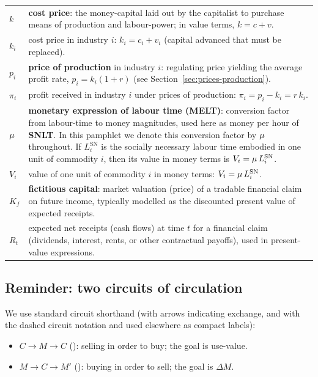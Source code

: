 \begin{longtable}{@{}>{\centering\arraybackslash}p{}@{\hspace{8pt}}%
                  >{\raggedright\arraybackslash}p{}@{}}
$k$ &
\textbf{cost price}: the money-capital laid out by the capitalist to purchase means of production and labour-power; in value terms, $k = c+v$. \\

$k_i$ &
cost price in industry $i$: $k_i = c_i + v_i$ (capital advanced that must be replaced). \\

$p_i$ &
\textbf{price of production} in industry $i$: regulating price yielding the average profit rate, $p_i = k_i(1+r)$ (see Section~\ref{sec:prices-production}). \\

$\pi_i$ &
profit received in industry $i$ under prices of production: $\pi_i = p_i - k_i = r\,k_i$. \\

$\mu$ &
\textbf{monetary expression of labour time (MELT)}: conversion factor from labour-time to money magnitudes, used here as money per hour of \textbf{SNLT}. In this pamphlet we denote this conversion factor by $\mu$ throughout. If $L^{\mathrm{SN}}_i$ is the socially necessary labour time embodied in one unit of commodity $i$, then its value in money terms is $V_i = \mu\,L^{\mathrm{SN}}_i$. \\

$V_i$ &
value of one unit of commodity $i$ in money terms: $V_i = \mu\,L^{\mathrm{SN}}_i$. \\

$K_f$ &
\textbf{fictitious capital}: market valuation (price) of a tradable financial claim on future income, typically modelled as the discounted present value of expected receipts. \\

$R_t$ &
expected net receipts (cash flows) at time $t$ for a financial claim (dividends, interest, rents, or other contractual payoffs), used in present-value expressions. \\

\end{longtable}
\endgroup

\subsection*{Reminder: two circuits of circulation}

We use standard circuit shorthand (with arrows indicating exchange, and with the dashed circuit notation \CMC{} and \MCM{} used elsewhere as compact labels):

\begin{itemize}[leftmargin=1.5em]
  \item $C \rightarrow M \rightarrow C$ (\CMC): selling in order to buy; the goal is use-value.
  \item $M \rightarrow C \rightarrow M'$ (\MCM): buying in order to sell; the goal is $\Delta M$.
\end{itemize}
